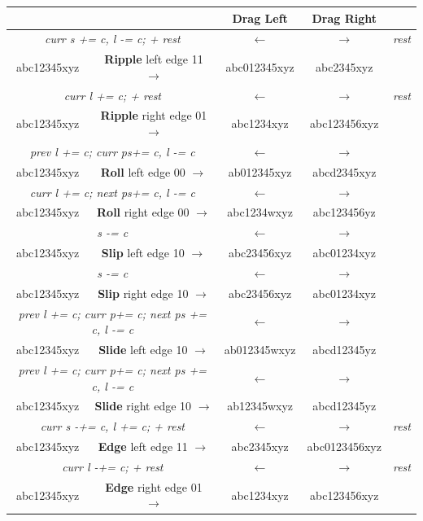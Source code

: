 \begin{longtable}{c c c c c}
    \toprule
    & & \textbf{Drag Left} & \textbf{Drag Right} & \\
    \midrule
    \endhead
    \multicolumn{2}{c}{\textit{curr s += c, l -= c; + rest}} & $\leftarrow$ & $\rightarrow$ & \textit{rest} \\
    abc12345xyz & \textbf{Ripple} left edge 11 $\rightarrow$ & abc012345xyz & abc2345xyz & \\
    \midrule
    \multicolumn{2}{c}{\textit{curr l += c; + rest}} & $\leftarrow$ & $\rightarrow$ & \textit{rest} \\
    abc12345xyz & \textbf{Ripple} right edge 01 $\rightarrow$ & abc1234xyz & abc123456xyz & \\
    \midrule
    \multicolumn{2}{c}{\textit{prev l += c; curr ps+= c, l -= c}} & $\leftarrow$ & $\rightarrow$ & \\
    abc12345xyz & \textbf{Roll} left edge 00 $\rightarrow$ & ab012345xyz & abcd2345xyz & \\
    \midrule
    \multicolumn{2}{c}{\textit{curr l += c; next ps+= c, l -= c}} & $\leftarrow$ & $\rightarrow$ & \\
    abc12345xyz & \textbf{Roll} right edge 00 $\rightarrow$ & abc1234wxyz & abc123456yz & \\
    \midrule
    \multicolumn{2}{c}{\textit{s -= c}} & $\leftarrow$ & $\rightarrow$ & \\
    abc12345xyz & \textbf{Slip} left edge 10 $\rightarrow$ & abc23456xyz & abc01234xyz & \\
    \midrule
    \multicolumn{2}{c}{\textit{s -= c}} & $\leftarrow$ & $\rightarrow$ & \\
    abc12345xyz & \textbf{Slip} right edge 10 $\rightarrow$ & abc23456xyz & abc01234xyz & \\
    \midrule
    \multicolumn{2}{c}{\textit{prev l += c; curr p+= c; next ps += c, l -= c}} & $\leftarrow$ & $\rightarrow$ & \\
    abc12345xyz & \textbf{Slide} left edge 10 $\rightarrow$ & ab012345wxyz & abcd12345yz & \\
    \midrule
    \multicolumn{2}{c}{\textit{prev l += c; curr p+= c; next ps += c, l -= c}} & $\leftarrow$ & $\rightarrow$ & \\
    abc12345xyz & \textbf{Slide} right edge 10 $\rightarrow$ & ab12345wxyz & abcd12345yz & \\
    \midrule
    \multicolumn{2}{c}{\textit{curr s -+= c, l += c; + rest}} & $\leftarrow$ & $\rightarrow$ & \textit{rest} \\
    abc12345xyz & \textbf{Edge} left edge 11 $\rightarrow$ & abc2345xyz & abc0123456xyz & \\
    \midrule
    \multicolumn{2}{c}{\textit{curr l -+= c; + rest}} & $\leftarrow$ & $\rightarrow$ & \textit{rest} \\
    abc12345xyz & \textbf{Edge} right edge 01 $\rightarrow$ & abc1234xyz & abc123456xyz & \\
    \bottomrule
\end{longtable}

